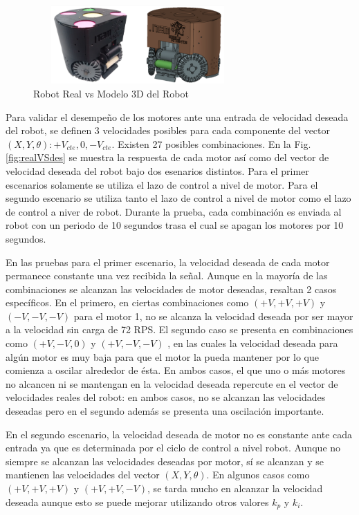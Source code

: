 \documentclass[twocolumn,10pt]{amrob}
\begin{document}
\begin{figure}
  \centering
    \includegraphics[height=3cm,width=8cm]{realVS3D.png}
  \caption{Robot Real vs Modelo 3D del Robot}
  \label{fig:ModRealVSdes}
\end{figure}
Para validar el desempeño de los motores ante una entrada de velocidad deseada del robot, se definen 3 velocidades posibles para cada componente del vector $(X, Y, \theta ): +V_{cte}, 0, -V_{cte}. $  Existen 27 posibles combinaciones. En la Fig. \ref{fig:realVSdes} se muestra la respuesta de cada motor así como del vector de velocidad deseada del robot bajo dos esenarios distintos. Para el primer escenarios solamente se utiliza el lazo de control a nivel de motor. Para el segundo escenario se utiliza tanto el lazo de control a nivel de motor como el lazo de control a niver de robot. Durante la prueba, cada combinación es enviada al robot con un periodo de 10 segundos trasa el cual se apagan los motores por 10 segundos.
\par
En las pruebas para el primer escenario, la velocidad deseada de cada motor permanece constante una vez recibida la señal. Aunque en la mayoría de las combinaciones se alcanzan las velocidades de motor deseadas, resaltan 2 casos específicos. En el primero, en ciertas combinaciones como $(+V, +V, +V )$ y $(-V, -V, -V) $ para el motor 1, no se alcanza la velocidad deseada por ser mayor a la velocidad sin carga de 72 RPS. El segundo caso se presenta en combinaciones como $(+V, -V, 0) $ y  $(+V, -V, -V)$ , en las cuales la velocidad deseada para algún motor es muy baja para que el motor la pueda mantener por lo que comienza a oscilar alrededor de ésta. En ambos casos, el que uno o más motores no alcancen ni se mantengan en la velocidad deseada repercute en el vector de velocidades reales del robot: en ambos casos, no se alcanzan las velocidades deseadas pero en el segundo además se presenta una oscilación importante.
\par
En el segundo escenario, la velocidad deseada de motor no es constante ante cada entrada ya que es determinada por el ciclo de control a nivel robot. Aunque no siempre se alcanzan las velocidades deseadas por motor, sí se alcanzan y se mantienen las velocidades del vector $(X, Y, \theta )$. En algunos casos como $(+V, +V, +V )$ y $(+V, +V, -V) $, se tarda mucho en alcanzar la velocidad deseada aunque esto se puede mejorar utilizando otros valores $k_p$ y $k_i$.
\par
\end{document}
